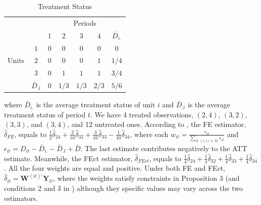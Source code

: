 \documentclass[12pt]{article}
\begin{document}
\begin{table}[!th]
\centering
\caption{Treatment Status}\label{atb:assign}
\setlength{\extrarowheight}{2pt}
\begin{tabular}{cc|cccc|c|}
  & \multicolumn{1}{c}{} & \multicolumn{5}{c}{Periods} \\
  & \multicolumn{1}{c}{} & \multicolumn{1}{c}{$1$}  & \multicolumn{1}{c}{$2$}  & \multicolumn{1}{c}{$3$} & \multicolumn{1}{c}{$4$}  & \multicolumn{1}{c}{$\bar{D}_{i.}$} \\\cline{3-7}
            & $1$ & $0$ & $0$ & $0$ & $0$ & $0$ \\ 
Units  & $2$ & $0$ & $0$ & $0$ & $1$ & $1/4$ \\\
            & $3$ & $0$ & $1$ & $1$  & $1$ & $3/4$ \\\cline{3-7}
            & $\bar{D}_{.t}$ & $0$ & $1/3$ & $1/3$  & $2/3$ & $5/6$\\\cline{3-7}
\end{tabular}
\end{table}
where $\bar{D}_{i.}$ is the average treatment status of unit $i$ and $\bar{D}_{.t}$ is the average treatment status of period $t$. We have 4 treated observations, $(2,4)$, $(3,2)$, $(3,3)$, and $(3,4)$, and 12 untreated ones. According to \citealt{de_Chaisemartin2018-iw}, the FE estimator, $\widehat{\delta}_{FE}$, equals to $\frac{1}{2}\widehat{\delta}_{24} + \frac{3}{10}\widehat{\delta}_{32} + \frac{3}{10}\widehat{\delta}_{33} - \frac{1}{10}\widehat{\delta}_{34}$, where each $w_{it} = \frac{\epsilon_{it}}{\sum_{it: (i, t) \in \mathcal{M}} \epsilon_{it}}$ and $\epsilon_{it} = D_{it} - \bar{D}_{i.} - \bar{D}_{.t} + \bar{D}$. The last estimate contributes negatively to the ATT estimate. Meanwhile, the FEct estimator, $\widehat{\delta}_{FEct}$, equals to $\frac{1}{4}\widehat{\delta}_{24} + \frac{1}{4}\widehat{\delta}_{32} + \frac{1}{4}\widehat{\delta}_{33} + \frac{1}{4}\widehat{\delta}_{34}$. All the four weights are equal and positive. Under both FE and FEct, $\widehat{\delta}_{it} = \mathbf{W}^{(it)'} \mathbf{Y}_{\mathcal{O}}$, where the weights satisfy constraints in Proposition 3 (and conditions 2 and 3 in \citealt{arkhangelsky2021double}) although they specific values may vary across the two estimators.
\end{document}
